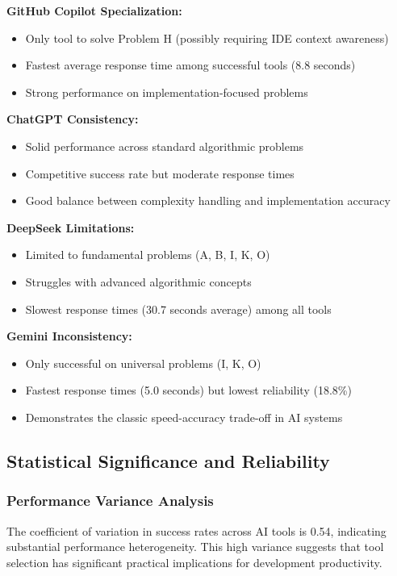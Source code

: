 \documentclass[conference]{IEEEtran}
\begin{document}
\textbf{GitHub Copilot Specialization:}
\begin{itemize}
    \item Only tool to solve Problem H (possibly requiring IDE context awareness)
    \item Fastest average response time among successful tools (8.8 seconds)
    \item Strong performance on implementation-focused problems
\end{itemize}

\textbf{ChatGPT Consistency:}
\begin{itemize}
    \item Solid performance across standard algorithmic problems
    \item Competitive success rate but moderate response times
    \item Good balance between complexity handling and implementation accuracy
\end{itemize}

\textbf{DeepSeek Limitations:}
\begin{itemize}
    \item Limited to fundamental problems (A, B, I, K, O)
    \item Struggles with advanced algorithmic concepts
    \item Slowest response times (30.7 seconds average) among all tools
\end{itemize}

\textbf{Gemini Inconsistency:}
\begin{itemize}
    \item Only successful on universal problems (I, K, O)
    \item Fastest response times (5.0 seconds) but lowest reliability (18.8\%)
    \item Demonstrates the classic speed-accuracy trade-off in AI systems
\end{itemize}

\subsection{Statistical Significance and Reliability}

\subsubsection{Performance Variance Analysis}

The coefficient of variation in success rates across AI tools is 0.54, indicating substantial performance heterogeneity. This high variance suggests that tool selection has significant practical implications for development productivity.
\end{document}
